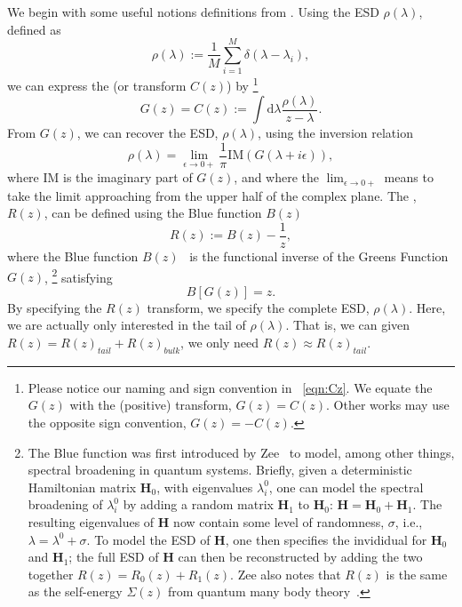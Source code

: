 We begin with some useful notions definitions from \RandomMatrixTheory.
%
Using the ESD $\rho(\lambda)$, defined as
\begin{equation}
\label{eqn:rgo}
\rho(\lambda):=\frac{1}{M}\sum_{i=1}^{M}\delta(\lambda-\lambda_{i})  ,
\end{equation}
%
we can express the \emph{\GreensFunction} (or \emph{\CauchyStieltjes} transform $C(z)$) by%
\footnote{Please notice our naming and sign convention in \EQN~\ref{eqn:Cz}.
We equate the \GreensFunction $G(z)$ with
the (positive) \CauchyStieltjes transform, $G(z)=C(z)$.   Other works may use the opposite sign convention, $G(z)=-C(z)$.}
\begin{equation}
\label{eqn:Cz}
G(z)=C(z):=\int \mathrm{d}\lambda \frac{\rho(\lambda)}{z-\lambda} .
\end{equation}
%
From $G(z)$, we can recover the ESD, $\rho(\lambda)$, using the inversion relation
\begin{equation}
\label{eqn:GzInverse}
\rho(\lambda)=\lim_{\epsilon\rightarrow 0+}\frac{1}{\pi}\mathrm{IM}(G(\lambda+i\epsilon))  ,
\end{equation}
where $\mathrm{IM}$ is the imaginary part of $G(z)$, and where the $\lim_{\epsilon\rightarrow 0+}$ means to take the limit approaching from the upper half of the complex plane.
%
The \RTransform, $R(z)$, can be defined using the Blue function $B(z)$ 
\begin{equation}
\label{eqn:Rz}
R(z):=B(z)-\frac{1}{z}  ,
\end{equation}
where the Blue function $B(z)$~\cite{Zee1996} is the functional inverse of the Greens Function $G(z)$,%
\footnote{The Blue function was first introduced by Zee~\cite{Zee1996} to model, among other things, spectral broadening in quantum systems.
Briefly, given a deterministic Hamiltonian matrix $\mathbf{H}_{0}$, with eigenvalues $\lambda^{0}_{i}$,
one can model the spectral broadening of $\lambda^{0}_{i}$ by adding a random matrix $\mathbf{H}_{1}$ to $\mathbf{H}_{0}$:
$\mathbf{H}=\mathbf{H}_{0}+\mathbf{H}_{1}$.  
The resulting eigenvalues of $\mathbf{H}$ now contain some level of randomness, $\sigma$, i.e., $\lambda=\lambda^{0}+\sigma$.  
To model the ESD of $\mathbf{H}$, one then specifies the invididual \RTransforms for $\mathbf{H}_{0}$ and $\mathbf{H}_{1}$; the full ESD of $\mathbf{H}$
can then be reconstructed by adding the two \RTransforms together $R(z)=R_{0}(z)+R_{1}(z)$.
Zee also notes that $R(z)$  is the same as the self-energy $\Sigma(z)$ from quantum many body theory~\cite{Zee1996}.}
satisfying 
\begin{equation}
\label{eqn:GzRelation}
B[G(z)]=z  .
\end{equation}
By specifying the $R(z)$ transform, we specify the complete ESD, $\rho(\lambda)$.
Here, we are actually only interested in the tail of $\rho(\lambda)$.
That is, we can given $R(z)=R(z)_{tail}+R(z)_{bulk}$, we only need $R(z)\approx R(z)_{tail}$.

